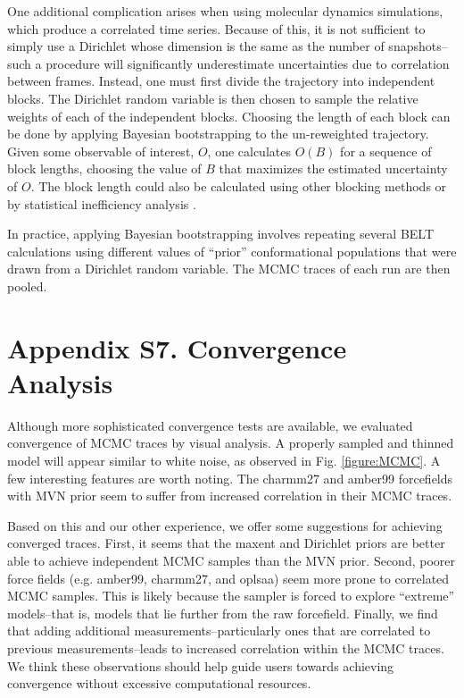 \documentclass[12pt]{article}
\begin{document}
One additional complication arises when using molecular dynamics simulations, which produce a correlated time series.  Because of this, it is not sufficient to simply use a Dirichlet whose dimension is the same as the number of snapshots--such a procedure will significantly underestimate uncertainties due to correlation between frames.  Instead, one must first divide the trajectory into independent blocks.  The Dirichlet random variable is then chosen to sample the relative weights of each of the independent blocks.  Choosing the length of each block can be done by applying Bayesian bootstrapping to the un-reweighted trajectory.  Given some observable of interest, $O$, one calculates $O(B)$ for a sequence of block lengths, choosing the value of $B$ that maximizes the estimated uncertainty of $O$.  The block length could also be calculated using other blocking methods \cite{flyvbjerg1989error} or by statistical inefficiency analysis \cite{shirts2008}.  

In practice, applying Bayesian bootstrapping involves repeating several BELT calculations using different values of ``prior'' conformational populations that were drawn from a Dirichlet random variable.  The MCMC traces of each run are then pooled.  

\newpage

\section*{Appendix S7.  Convergence Analysis}

Although more sophisticated convergence tests are available, we evaluated convergence of MCMC traces by visual analysis.  A properly sampled and thinned model will appear similar to white noise, as observed in Fig. \ref{figure:MCMC}.  A few interesting features are worth noting.  The charmm27 and amber99 forcefields with MVN prior seem to suffer from increased correlation in their MCMC traces.  

Based on this and our other experience, we offer some suggestions for achieving converged traces.  First, it seems that the maxent and Dirichlet priors are better able to achieve independent MCMC samples than the MVN prior.  Second, poorer force fields (e.g. amber99, charmm27, and oplsaa) seem more prone to correlated MCMC samples.  This is likely because the sampler is forced to explore ``extreme'' models--that is, models that lie further from the raw forcefield.  Finally, we find that adding additional measurements--particularly ones that are correlated to previous measurements--leads to increased correlation within the MCMC traces.  We think these observations should help guide users towards achieving convergence without excessive computational resources.  

\newpage



\end{document}
